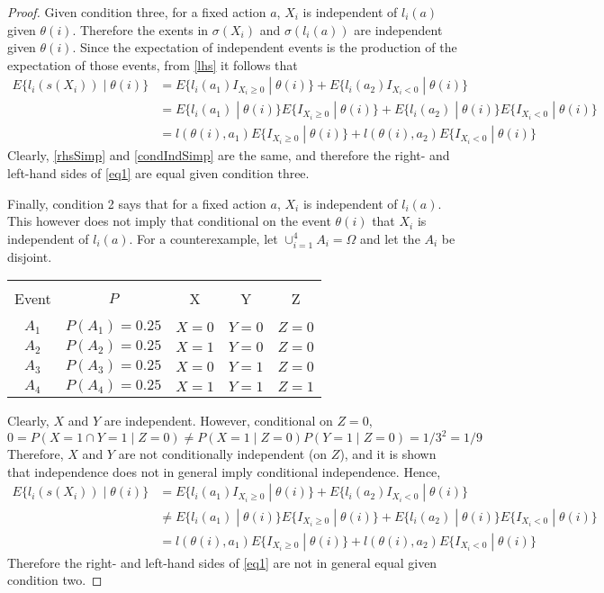 \documentclass[letterpaper, 12pt]{article}\usepackage[]{graphicx}\usepackage[]{color}
\newcommand{\sbs}{\;|\;} %
\begin{document}
\begin{proof}
Given condition three, for a fixed action $a$, $X_i$ is independent of $l_i(a)$ given $\theta(i)$. Therefore the exents in $\sigma(X_i)$ and $\sigma(l_i(a))$ are independent given $\theta(i)$. 
Since the expectation of independent events is the production of the expectation of those events, from \eqref{lhs} it follows that
\begin{align}
E\{l_i(s(X_i)) \sbs \theta(i)\}
&=
E\{l_i(a_1)I_{X_i \geq 0} \sbs \theta(i)\}
+ 
E\{l_i(a_2) I_{X_i < 0} \sbs \theta(i)\}
\\
&=
E\{l_i(a_1)\sbs \theta(i)\} E\{I_{X_i \geq 0} \sbs \theta(i)\}
+
E\{l_i(a_2)\sbs \theta(i)\} E\{I_{X_i < 0} \sbs \theta(i)\}
\\
&=
l(\theta(i), a_1)E\{I_{X_i \geq 0} \sbs \theta(i)\}
+
l(\theta(i), a_2)E\{I_{X_i < 0} \sbs \theta(i)\}
\label{condIndSimp}
\end{align}
Clearly, \eqref{rhsSimp} and \eqref{condIndSimp} are the same, and therefore the right- and left-hand sides of \eqref{eq1} are equal given condition three.

Finally, condition 2 says that for a fixed action $a$, $X_i$ is independent of $l_i(a)$. This however does not imply that conditional on the event $\theta(i)$ that $X_i$ is independent of $l_i(a)$. 
For a counterexample, let $\cup_{i=1}^4 A_i = \Omega$ and let the $A_i$ be disjoint.

\begin{table}[H]
\centering
\begin{tabular}{c c c c c}
\hline\hline \\[-2.0ex]
Event & $P$ & X & Y & Z \\ [0.25ex]
\hline \\[-2.0ex]
$A_1$ & $P(A_1)=0.25$ & $X=0$ & $Y=0$ & $Z=0$
\\
$A_2$ & $P(A_2)=0.25$ & $X=1$ & $Y=0$ & $Z=0$
\\
$A_3$ & $P(A_3)=0.25$ & $X=0$ & $Y=1$ & $Z=0$
\\
$A_4$ & $P(A_4)=0.25$ & $X=1$ & $Y=1$ & $Z=1$
\end{tabular}
\end{table}
Clearly, $X$ and $Y$ are independent. However, conditional on $Z=0$, 
\[
0 = P(X=1 \cap Y=1 \sbs Z=0) \neq P(X=1 \sbs Z=0) P(Y=1 \sbs Z=0) = 1/3^2 = 1/9
\]
Therefore, $X$ and $Y$ are not conditionally independent (on $Z$), and it is shown that independence does not in general imply conditional independence. 
Hence,
\begin{align}
E\{l_i(s(X_i)) \sbs \theta(i)\}
&=
E\{l_i(a_1)I_{X_i \geq 0} \sbs \theta(i)\}
+ 
E\{l_i(a_2) I_{X_i < 0} \sbs \theta(i)\}
\\
&\neq
E\{l_i(a_1)\sbs \theta(i)\} E\{I_{X_i \geq 0} \sbs \theta(i)\}
+
E\{l_i(a_2)\sbs \theta(i)\} E\{I_{X_i < 0} \sbs \theta(i)\}
\\
&=
l(\theta(i), a_1)E\{I_{X_i \geq 0} \sbs \theta(i)\}
+
l(\theta(i), a_2)E\{I_{X_i < 0} \sbs \theta(i)\}
\end{align}
Therefore the right- and left-hand sides of \eqref{eq1} are not in general equal given condition two.
\end{proof}
\end{document}
